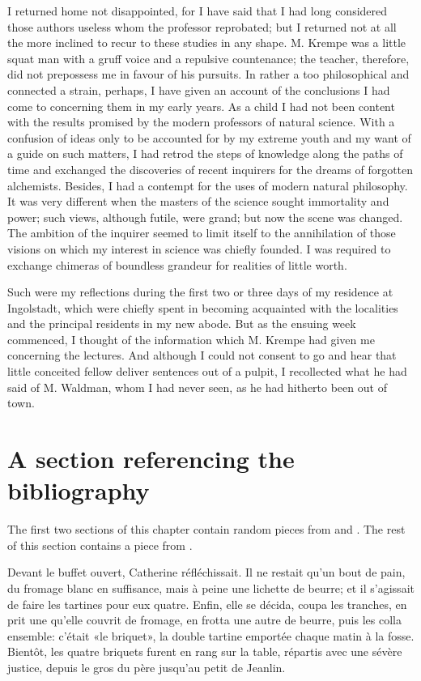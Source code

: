 \documentclass[12pt]{orbotech}
\begin{document}
I returned home not disappointed, for I have said that I had long
considered those authors useless whom the professor reprobated; but I
returned not at all the more inclined to recur to these studies in any
shape.  M. Krempe was a little squat man with a gruff voice and a
repulsive countenance; the teacher, therefore, did not prepossess me in
favour of his pursuits.  In rather a too philosophical and connected a
strain, perhaps, I have given an account of the conclusions I had come
to concerning them in my early years.  As a child I had not been
content with the results promised by the modern professors of natural
science.  With a confusion of ideas only to be accounted for by my
extreme youth and my want of a guide on such matters, I had retrod the
steps of knowledge along the paths of time and exchanged the
discoveries of recent inquirers for the dreams of forgotten alchemists.
Besides, I had a contempt for the uses of modern natural philosophy.
It was very different when the masters of the science sought
immortality and power; such views, although futile, were grand; but now
the scene was changed.  The ambition of the inquirer seemed to limit
itself to the annihilation of those visions on which my interest in
science was chiefly founded.  I was required to exchange chimeras of
boundless grandeur for realities of little worth.

Such were my reflections during the first two or three days of my
residence at Ingolstadt, which were chiefly spent in becoming
acquainted with the localities and the principal residents in my new
abode.  But as the ensuing week commenced, I thought of the information
which M. Krempe had given me concerning the lectures.  And although I
could not consent to go and hear that little conceited fellow deliver
sentences out of a pulpit, I recollected what he had said of M.
Waldman, whom I had never seen, as he had hitherto been out of town.

\section{A section referencing the bibliography}\label{sec:third_example}

The first two sections of this chapter contain random pieces from \citet{Shelley:1993:F} and \citet{Joyce:2003:U}. The rest of this section contains a piece from \citet{Zola:2004:G}.

Devant le buffet ouvert, Catherine réfléchissait.  Il ne restait qu'un
bout de pain, du fromage blanc en suffisance, mais à peine une
lichette de beurre; et il s'agissait de faire les tartines pour eux
quatre.  Enfin, elle se décida, coupa les tranches, en prit une
qu'elle couvrit de fromage, en frotta une autre de beurre, puis les
colla ensemble: c'était «le briquet», la double tartine emportée
chaque matin à la fosse.  Bientôt, les quatre briquets furent en rang
sur la table, répartis avec une sévère justice, depuis le gros du père
jusqu'au petit de Jeanlin.
\end{document}
